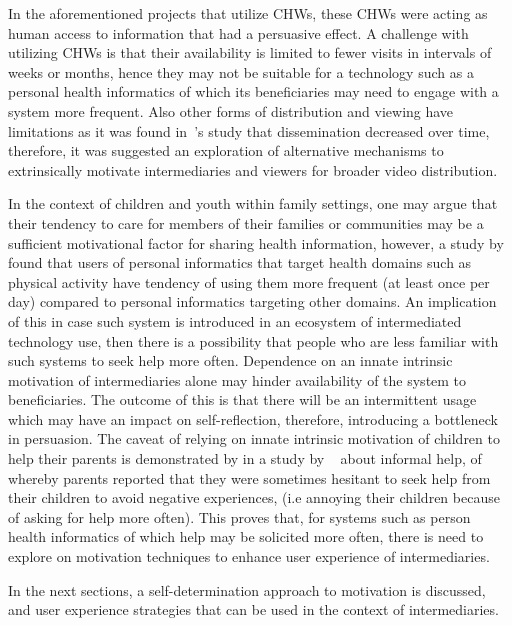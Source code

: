 In the aforementioned projects that utilize CHWs, these CHWs were acting as human access to information that had a persuasive effect. A challenge with utilizing CHWs is that their availability is limited to fewer visits in intervals of weeks or months, hence they may not be suitable for a technology such as a personal health informatics of which its beneficiaries may need to engage with a system more frequent. Also other forms of distribution and viewing have limitations as it was found in~\cite{vashistha2016mobile}'s study that dissemination decreased over time, therefore, it was  suggested an exploration of alternative mechanisms  to extrinsically motivate intermediaries and viewers for broader video distribution.

In the context of children and youth within family settings, one may argue that their tendency to care for members of their families or communities may be a sufficient motivational factor for sharing health information, however, a study by~\cite{epstein2015lived} found that users of personal informatics that target health domains such as physical activity have tendency of using them more frequent (at least once per day) compared to personal informatics targeting other domains. An implication of this in case such system is introduced in an ecosystem of intermediated technology use, then there is a possibility that people who are less familiar with such systems to seek help more often. Dependence on  an innate intrinsic motivation of intermediaries alone may hinder availability of the system to beneficiaries. The outcome of this is that there will be an intermittent usage which may have an impact on self-reflection, therefore, introducing a bottleneck in persuasion. The caveat of relying on innate intrinsic motivation of children to help their parents is demonstrated by in a study by ~\cite{kiesler:twi} about informal help, of whereby parents reported that they were sometimes hesitant to seek help from their children to avoid negative experiences, (i.e annoying their children because of asking for help more often). This proves that, for systems such as person health informatics of which help may be solicited more often, there is need to explore on motivation techniques to enhance user experience of intermediaries.

In the next sections, a self-determination approach to motivation is discussed, and user experience strategies that can be used in the context of intermediaries. 
